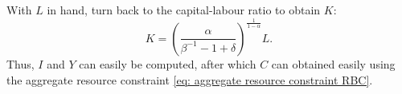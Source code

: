 \documentclass[12pt,english]{extarticle}
\begin{document}
	With $L$ in hand, turn back to the capital-labour ratio to obtain $K$:
	\begin{equation*}
		K = \left(\frac{\alpha}{\beta^{-1}-1+\delta}\right)^{\frac{1}{1-\alpha}}L.
	\end{equation*}
	Thus, $I$ and $Y$ can easily be computed, after which $C$ can obtained easily using the aggregate resource constraint \eqref{eq: aggregate resource constraint RBC}.
	
\end{document}
